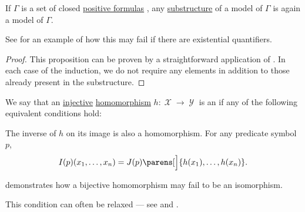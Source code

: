 \begin{proposition}\label{thm:substructure_is_model}
  If \( \Gamma \) is a set of closed \hyperref[def:positive_formula]{positive formulas} , any \hyperref[def:first_order_substructure]{substructure} of a model of \( \Gamma \) is again a model of \( \Gamma \).
\end{proposition}
\begin{comments}
  \item See  for an example of how this may fail if there are existential quantifiers.
\end{comments}
\begin{proof}
  This proposition can be proven by a straightforward application of . In each case of the induction, we do not require any elements in addition to those already present in the substructure.
\end{proof}

\begin{definition}\label{def:first_order_embedding}
  We say that an \hyperref[def:function_invertibility/injective]{injective} \hyperref[def:first_order_homomorphism]{homomorphism} \( h: \mscrX \to \mscrY \) is an  if any of the following equivalent conditions hold:

  \begin{thmenum}
     The inverse of \( h \) on its image is also a homomorphism.
     For any predicate symbol \( p \),
    \begin{equation*}
      I(p) (x_1, \ldots, x_n) = J(p) \parens[\Big]{ h(x_1), \ldots, h(x_n) }.
    \end{equation*}
  \end{thmenum}
\end{definition}
\begin{comments}
  \item {} demonstrates how a bijective homomorphism may fail to be an isomorphism.

  \item This condition can often be relaxed --- see  and .
\end{comments}

